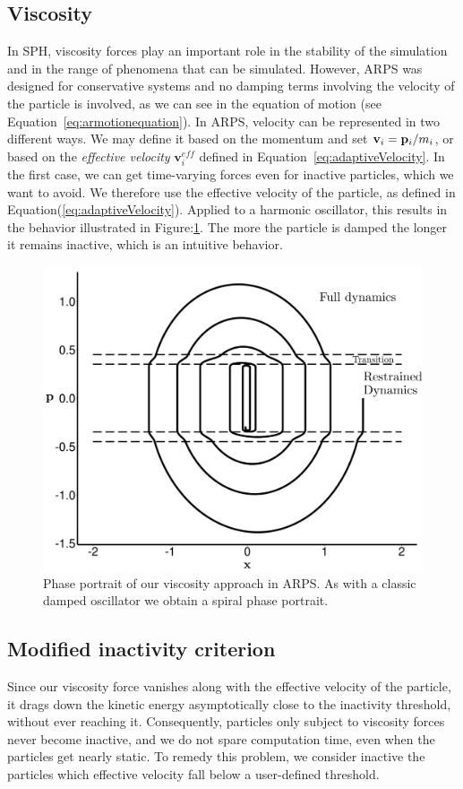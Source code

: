 \subsection{Viscosity}
In SPH, viscosity forces play an important role in the stability of the simulation and in the range of phenomena that can be simulated. 
However, ARPS was designed for conservative systems and no damping terms involving the velocity of the particle is involved, as we can see in the equation of motion (see Equation~\ref{eq:armotionequation}).
In ARPS, velocity can be represented in two different ways.
We may define it based on the momentum and set $\mathbf{v}_{i} = \mathbf{p}_{i} / m_{i} $, or based on the \emph{effective velocity} $\mathbf{v}_{i}^{eff}$ defined in Equation~\ref{eq:adaptiveVelocity}.
In the first case, we can get time-varying forces even for inactive particles, which we want to avoid.
We therefore use the effective velocity of the particle, as defined in Equation(\ref{eq:adaptiveVelocity}).
Applied to a harmonic oscillator, this results in the behavior illustrated in Figure:\ref{fig:HODampedPP}.
The more the particle is damped the longer it remains inactive, which is an intuitive behavior.
\begin{figure}[H]
  \centering
  \includegraphics[width=0.8\linewidth]{images/arps-vriphys2013/harmonicOscillatorDampedPhasePortraitraw_hacked.png}
  \caption[ARPS: Phase portrait of a damped ARPS harmonic oscillator]
  {\label{fig:HODampedPP} Phase portrait of our viscosity approach in ARPS.
  As with a classic damped oscillator we obtain a spiral phase portrait.}
\end{figure}
\subsection{Modified inactivity criterion}
Since our viscosity force vanishes along with the effective velocity of the particle, it drags down the kinetic energy asymptotically close to the inactivity threshold, without ever reaching it.
Consequently, particles only subject to viscosity forces never become inactive, and we do not spare computation time, even when the particles get nearly static.
To remedy this problem, we consider inactive the particles which effective velocity fall below a user-defined threshold.

